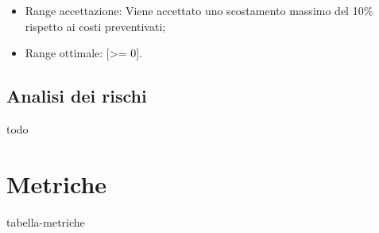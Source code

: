 \begin{itemize}
	\item Range accettazione: Viene accettato uno scostamento massimo del 10\% rispetto ai costi preventivati;
	\item Range ottimale: [>= 0].
\end{itemize}


\subsection{Analisi dei rischi}
todo
\section{Metriche}
tabella-metriche